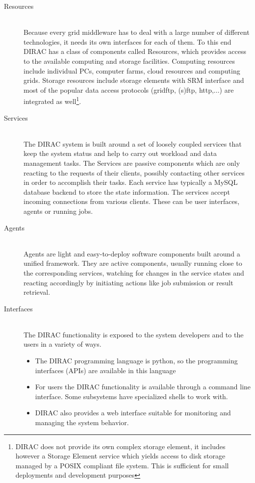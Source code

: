 \begin{description}

\item[Resources] \hfill \\
Because every grid middleware has to deal with a large number of different technologies, it needs its own 
interfaces for each of them. To this end DIRAC has a class of components called Resources,
which provides access to the available computing and storage facilities. 
Computing resources include individual PCs, computer farms, cloud resources and computing grids. Storage 
resources include storage elements with SRM interface \cite{SRM} and most of the popular data access 
protocols (gridftp, (s)ftp, http,...) are integrated as well\footnote{DIRAC does not provide its own complex 
storage element, it includes however a Storage Element service which yields access to disk 
storage managed by a POSIX compliant file system. This is sufficient for small deployments and development
purposes}.

\pagebreak

\item[Services] \hfill \\
The DIRAC system is built around a set of loosely coupled services that keep the system status and
help to carry out workload and data management tasks. The Services are passive components which
are only reacting to the requests of their clients, possibly contacting other services in order to
accomplish their tasks. Each service has typically a MySQL \cite{MySQL} database backend to store the state
information. The services accept incoming connections from various clients. These can be user interfaces,
agents or running jobs. 

\item[Agents] \hfill \\
Agents are light and easy-to-deploy software components built around a unified framework. They are active
components, usually running close to the corresponding services, watching for changes in the service states and 
reacting accordingly by initiating actions like job submission or result retrieval. 

\item[Interfaces] \hfill \\
The DIRAC functionality is exposed to the system developers and to the users in a variety of ways. 
	\begin{itemize}
		\item The DIRAC programming language is python, so the programming interfaces (APIs) are available in this 
			language
		\item For users the DIRAC functionality is available through a command line interface. Some subsystems 		
			have specialized shells to work with.
		\item DIRAC also provides a web interface suitable for monitoring and managing the system behavior.
	\end{itemize}

\end{description}

